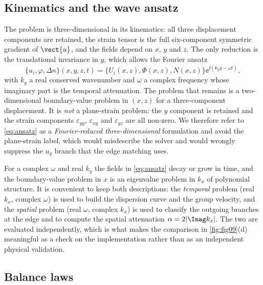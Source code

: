 \subsection{Kinematics and the wave ansatz}
\label{sec:governing_kinematics}

The problem is three-dimensional in its kinematics: all three displacement
components are retained, the strain tensor is the full six-component symmetric
gradient of $\vect{u}$, and the fields depend on $x$, $y$ and $z$.  The only
reduction is the translational invariance in $y$, which allows the
Fourier ansatz
\begin{equation}
\label{eq:ansatz}
\bigl\{u_i,\varphi,\Delta n\bigr\}(x,y,z,t)
=\bigl\{U_i(x,z),\Phi(x,z),N(x,z)\bigr\}\ee^{\ii(k_yy-\omega t)},
\end{equation}
with $k_y$ a real conserved wavenumber and $\omega$ a complex frequency whose
imaginary part is the temporal attenuation.  The problem that remains is a
two-dimensional boundary-value problem in $(x,z)$ for a three-component
displacement.  It is \emph{not} a plane-strain problem: the $y$ component is
retained and the strain components $\varepsilon_{yy}$, $\varepsilon_{xy}$ and
$\varepsilon_{yz}$ are all non-zero.  We therefore refer to
\eqref{eq:ansatz} as a \emph{Fourier-reduced three-dimensional} formulation and
avoid the plane-strain label, which would misdescribe the solver and would
wrongly suppress the $u_y$ branch that the edge matching uses.

For a complex $\omega$ and real $k_y$ the fields in \eqref{eq:ansatz} decay or
grow in time, and the boundary-value problem in $x$ is an eigenvalue problem in
$k_x$ of polynomial structure.  It is convenient to keep both descriptions:
the \emph{temporal} problem (real $k_x$, complex $\omega$) is used to build the
dispersion curve and the group velocity, and the \emph{spatial} problem (real
$\omega$, complex $k_x$) is used to classify the outgoing branches at the edge
and to compute the spatial attenuation $\alpha=2|\Imag k_x|$.  The two are
evaluated independently, which is what makes the comparison in
\cref{fig:fig09}(d) meaningful as a check on the implementation rather than as
an independent physical validation.

\subsection{Balance laws}
\label{sec:governing_balance}

